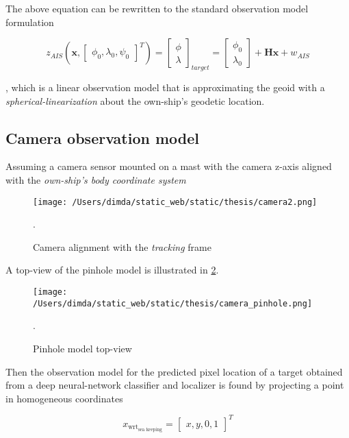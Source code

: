 The above equation can be rewritten to the standard observation model formulation

\begin{equation}
z_{AIS}(\mathbf{x},\begin{bmatrix}\phi_{0}, \lambda_{0}, \psi_{\textit{0}} \end{bmatrix}^{T}) = \begin{bmatrix}
\phi\\ \lambda
\end{bmatrix}_{\textit{target}} = \begin{bmatrix}
\phi_{0}\\ \lambda_{0}
\end{bmatrix} + \mathbf{H}\mathbf{x} + w_{\textit{AIS}}
\end{equation}

, which is a linear observation model that is approximating the geoid with a \emph{spherical-linearization} about the own-ship's geodetic location.

\subsection{Camera observation model}


Assuming a camera sensor mounted on a mast with the camera z-axis aligned with the \emph{own-ship's body coordinate system}



\begin{figure}[H]
	\centering
	\texttt{[image: /Users/dimda/static\_web/static/thesis/camera2.png]}
	\caption{Camera alignment with the \emph{tracking} frame}.
	\label{fig:camera_alignment_tracking}
\end{figure}

A top-view of the pinhole model is illustrated in \cref{fig:camera_pinhole}.


\begin{figure}[H]
	\centering
	\texttt{[image: /Users/dimda/static\_web/static/thesis/camera\_pinhole.png]}
	\caption{Pinhole model top-view}.
	\label{fig:camera_pinhole}
\end{figure}


Then the observation model for the predicted pixel location of a target obtained from a deep neural-network classifier and localizer is found by projecting a point in homogeneous coordinates


\begin{equation}
x_{\text{wrt}_{\text{sea keeping}}} =\begin{bmatrix}x, y, 0, 1\end{bmatrix}^T
\end{equation}


